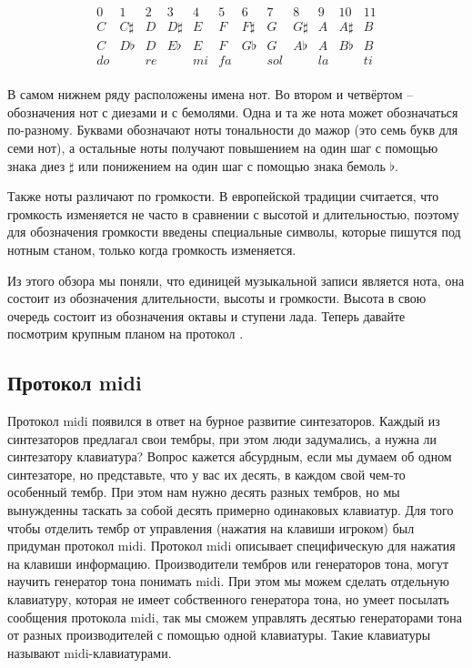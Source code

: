 \[
\begin{array}{llllllllllll}
    0   &   1    & 2 & 3    & 4 & 5 & 6 & 7 & 8 & 9 & 10 & 11 \\
  C   &   C\sharp  & D & D\sharp  & E & F & F\sharp &
  G   &   G\sharp  & A & A\sharp & B \\ 
 C   &  D\flat    & D & E\flat & E & F & G\flat & G & A\flat 
 & A & B\flat & B \\
 do & & re & & mi & fa & & sol & & la & & ti \\
\end{array}
\]

В самом нижнем ряду расположены имена нот. Во втором
и четвёртом -- обозначения нот с диезами и с бемолями. 
Одна и та же нота может обозначаться по-разному. 
Буквами обозначают ноты тональности до мажор 
(это семь букв для семи нот), а остальные ноты
получают повышением на один шаг с помощью знака
диез $\sharp$ или понижением на один шаг с помощью
знака бемоль $\flat$.

Также ноты различают по громкости. В европейской
традиции считается, что громкость изменяется 
не часто в сравнении с высотой и длительностью, поэтому 
для обозначения громкости введены специальные символы,
которые пишутся под нотным станом, только когда громкость 
изменяется.

Из этого обзора мы поняли, что единицей музыкальной
записи является нота, она состоит из обозначения 
длительности, высоты и громкости. Высота в свою очередь
состоит из обозначения октавы и ступени лада.
Теперь давайте посмотрим крупным планом на протокол
.

\subsection{Протокол midi}

Протокол midi появился в ответ на бурное развитие 
синтезаторов. Каждый из синтезаторов предлагал
свои тембры, при этом люди задумались, а нужна ли 
синтезатору клавиатура? Вопрос кажется абсурдным,
если мы думаем об одном синтезаторе, но представьте,
что у вас их десять, в каждом свой чем-то особенный
тембр. При этом нам нужно десять разных тембров,
но мы вынужденны таскать за собой десять примерно 
одинаковых клавиатур. Для того чтобы отделить 
тембр от управления (нажатия на клавиши игроком)
был придуман протокол midi. Протокол midi описывает
специфическую для нажатия на клавиши информацию. 
Производители тембров или генераторов тона, могут
научить генератор тона понимать midi. При этом
мы можем сделать отдельную клавиатуру, которая не 
имеет собственного генератора тона, но умеет
посылать сообщения протокола midi, так мы
сможем управлять десятью генераторами тона
от разных производителей с помощью одной клавиатуры.
Такие клавиатуры называют midi-клавиатурами.

